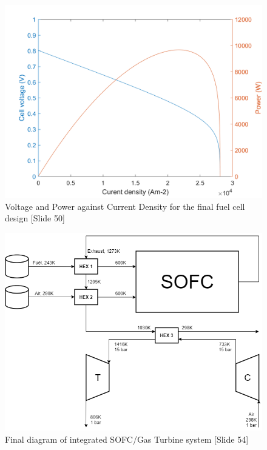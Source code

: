   \begin{figure}[htb]
        \centering
        \includegraphics[scale=0.4]{power_voltage_against_current.png}
        \caption{Voltage and Power against Current Density for the final fuel cell design [Slide 50]}
        \label{fig:SOFCbasic}
    \end{figure}
   
      \begin{figure}[htb]
        \centering
        \includegraphics[scale=0.6]{SOFC/handout/Systemdiagram.png}
        \caption{Final diagram of integrated SOFC/Gas Turbine system [Slide 54]}
        \label{fig: Simple diagram of a single Solid Oxide Fuel Cell}
    \end{figure}
    
%